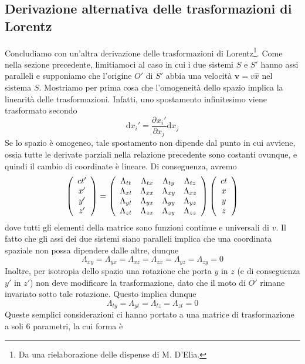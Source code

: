 \documentclass[a4paper,11pt]{book}
\newcommand{\dif}{\mathrm{d}}
\newcommand{\der}[3][]{\frac{\partial ^{#1}#2}{\partial {#3}^{#1}}}
\renewcommand{\vec}[1]{\mathbf{#1}}
\theoremstyle{theorem}
\theoremstyle{definition}
\begin{document}
\subsection{Derivazione alternativa delle trasformazioni di Lorentz}
Concludiamo con un'altra derivazione delle trasformazioni di Lorentz\footnote{Da una rielaborazione delle dispense di M. D'Elia.}. Come nella sezione precedente, limitiamoci al caso in cui i due sistemi $S$ e $S'$ hanno assi paralleli e supponiamo che l'origine $O'$ di $S'$ abbia una velocità $\vec{v}=v\hat{x}$ nel sistema $S$. Mostriamo per prima cosa che l'omogeneità dello spazio implica la linearità delle trasformazioni. Infatti, uno spostamento infinitesimo viene trasformato secondo
\[\dif x_i'=\der{x_i'}{x_j}\dif x_j\]
Se lo spazio è omogeneo, tale spostamento non dipende dal punto in cui avviene, ossia tutte le derivate parziali nella relazione precedente sono costanti ovunque, e quindi il cambio di coordinate è lineare. Di conseguenza, avremo
\[\left(\begin{array}{c}
ct'\\x'\\y'\\z'
\end{array}\right)=\left(\begin{array}{c c c c}
\Lambda_{tt}&\Lambda_{tx}&\Lambda_{ty}&\Lambda_{tz}\\
\Lambda_{xt}&\Lambda_{xx}&\Lambda_{xy}&\Lambda_{xz}\\
\Lambda_{yt}&\Lambda_{yx}&\Lambda_{yy}&\Lambda_{yz}\\
\Lambda_{zt}&\Lambda_{zx}&\Lambda_{zy}&\Lambda_{zz}
\end{array}\right)\left(\begin{array}{c}
ct\\x\\y\\z
\end{array}\right)\]
dove tutti gli elementi della matrice sono funzioni continue e universali di $v$. Il fatto che gli assi dei due sistemi siano paralleli implica che una coordinata spaziale non possa dipendere dalle altre, dunque
\[
\Lambda_{xy}=\Lambda_{yx}=\Lambda_{xz}=\Lambda_{zx}=
\Lambda_{yz}=\Lambda_{zy}=0\]
Inoltre, per isotropia dello spazio una rotazione che porta $y$ in $z$ (e di conseguenza $y'$ in $z'$) non deve modificare la trasformazione, dato che il moto di $O'$ rimane invariato sotto tale rotazione. Questo implica dunque
\[
\Lambda_{ty}=\Lambda_{yt}=\Lambda_{tz}=\Lambda_{zt}=0\]
Queste semplici considerazioni ci hanno portato a una matrice di trasformazione a soli 6 parametri, la cui forma è
\end{document}
